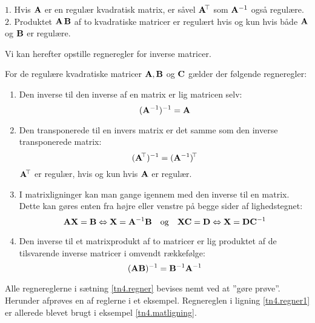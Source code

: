 \begin{lemma}
$1.$ Hvis $\mathbf{A}$ er en regulær kvadratisk matrix, er såvel $\mathbf{A}\hspace*{-.6mm}^{\top}$ som $\mathbf{A}^{-1}$ også regulære.\bs
$2.$ Produktet $\mathbf{A}\,\mathbf{B}$ af to kvadratiske matricer er regulært hvis og kun hvis både $\mathbf{A}$ og $\mathbf{B}$ er regulære.
\end{lemma}

Vi kan herefter opstille regneregler for inverse matricer.

\begin{theorem} \label{tn4.regner}

For de regulære kvadratiske matricer $ \mathbf{A}, \mathbf{B} $ og $ \mathbf{C} $ gælder der følgende regneregler:
\begin{enumerate}
\item Den inverse til den inverse af en matrix er lig matricen selv:
\begin{equation}
(\mathbf{A}^{-1})^{-1} = \mathbf{A} \label{tn4.regner2}
\end{equation}
\item Den transponerede til en invers matrix er det samme som den inverse transponerede matrix: 
\begin{equation}
(\mathbf{A}\hspace*{-.6mm}^{\top})^{-1} = (\mathbf{A}^{-1})\hspace*{-.6mm}^{\top} \label{tn4.regner3}
\end{equation}
$ \mathbf{A}\hspace*{-.6mm}^{\top} $ er regulær, hvis og kun hvis $ \mathbf{A} $ er regulær.
\item I matrixligninger kan man gange igennem med den inverse til en matrix. Dette kan gøres enten fra højre eller venstre på begge sider af lighedstegnet:
\begin{equation}
\mathbf{A} \mathbf{X} = \mathbf{B} \Leftrightarrow \mathbf{X} = \mathbf{A}^{-1} \mathbf{B} \quad \mathrm{og} \quad \mathbf{X} \mathbf{C} = \mathbf{D} \Leftrightarrow \mathbf{X} = \mathbf{D} \mathbf{C}^{-1} \label{tn4.regner1}
\end{equation}
\item Den inverse til et matrixprodukt af to matricer er lig produktet af de tilsvarende inverse matricer i omvendt rækkefølge:
\begin{equation}
(\mathbf{A} \mathbf{B})^{-1} = \mathbf{B}^{-1} \mathbf{A}^{-1}
\end{equation}
\end{enumerate}
\end{theorem}

Alle regnereglerne i sætning \ref{tn4.regner} bevises nemt ved at ''gøre prøve''.\bs
Herunder afprøves en af reglerne i et eksempel. Regnereglen i ligning \eqref{tn4.regner1} er allerede blevet brugt i eksempel \ref{tn4.matligning}. 

